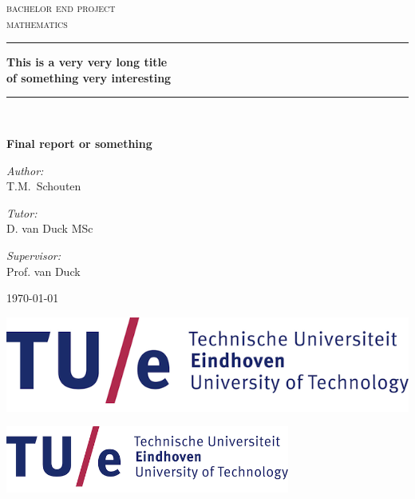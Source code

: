 \documentclass{article}
\begin{document}
    \begin{titlepage}
        \centering

        \textsc{\LARGE bachelor end project} \\ [2.5em]
        \textsc{\Large mathematics} \\ [6em]

        \rule{\linewidth}{.4pt} \par
        \linespread{1.5} %
        {\Huge \bfseries This is a very very long title \\ of something very interesting \par}
        \vspace*{.5cm}
        \rule{\linewidth}{.4pt} \\ [1em]

        {\huge \bfseries Final report or something \par}
        \vspace*{7em}

        \begin{minipage}[t]{.3\textwidth}
            \textit{Author:} \\
            T.M.\ Schouten
        \end{minipage}%
        \begin{minipage}[t]{.3\textwidth}
            \textit{Tutor:} \\
            D. van Duck MSc
        \end{minipage}%
        \begin{minipage}[t]{.3\textwidth}
            \textit{Supervisor:} \\
            Prof. van Duck
        \end{minipage}


        \vfill

        \today

        \vfill

        \begin{minipage}{0.5\textwidth}
            \begin{flushleft}
                \includegraphics[width=.7\textwidth]{tue-logo} \\
            \end{flushleft}
        \end{minipage}%
        \begin{minipage}{0.5\textwidth}
            \begin{flushright}
                \includegraphics[width=0.7\textwidth]{tue-logo} \\
            \end{flushright}
        \end{minipage}



\end{titlepage}
\end{document}
